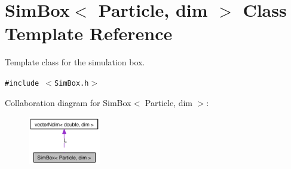 \hypertarget{classSimBox}{
\section{SimBox$<$ Particle, dim $>$ Class Template Reference}
\label{classSimBox}
}
Template class for the simulation box.  


{\tt \#include $<$SimBox.h$>$}

Collaboration diagram for SimBox$<$ Particle, dim $>$:\nopagebreak
\begin{figure}[H]
\begin{center}
\leavevmode
\includegraphics[width=89pt]{classSimBox__coll__graph}
\end{center}
\end{figure}
